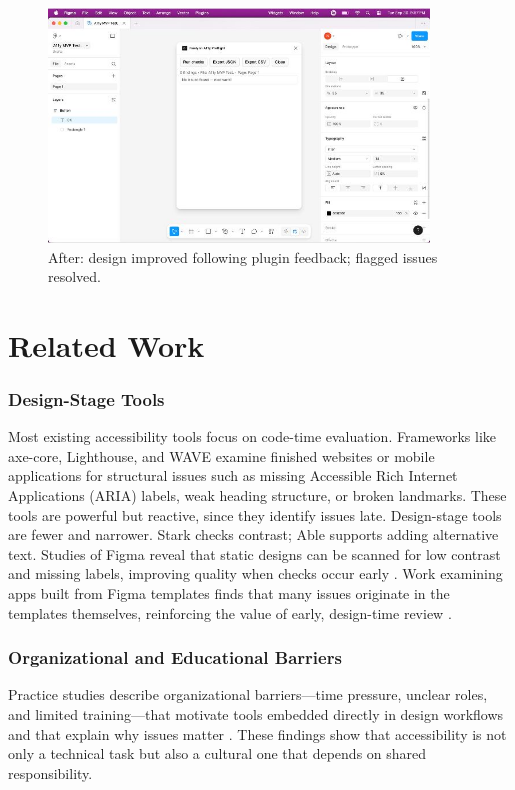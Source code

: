 \documentclass[12pt]{article}
\begin{document}
\begin{figure}[H]
  \centering
  \includegraphics[width=0.9\textwidth]{after.jpg}
  \caption{After: design improved following plugin feedback; flagged issues resolved.}
  \label{fig:after}
\end{figure}

\section{Related Work}

\subsubsection*{Design-Stage Tools}
Most existing accessibility tools focus on code-time evaluation. Frameworks like axe-core, Lighthouse, and WAVE examine finished websites or mobile applications for structural issues such as missing Accessible Rich Internet Applications (ARIA) labels, weak heading structure, or broken landmarks. These tools are powerful but reactive, since they identify issues late. Design-stage tools are fewer and narrower. Stark checks contrast; Able supports adding alternative text. Studies of Figma reveal that static designs can be scanned for low contrast and missing labels, improving quality when checks occur early \cite{huang2024a11yfigma, chen2024figmaapps}. Work examining apps built from Figma templates finds that many issues originate in the templates themselves, reinforcing the value of early, design-time review \cite{muniz2024figmatemplates}.

\subsubsection*{Organizational and Educational Barriers}
Practice studies describe organizational barriers—time pressure, unclear roles, and limited training—that motivate tools embedded directly in design workflows and that explain why issues matter \cite{shi2023uxaccesspractice}. These findings show that accessibility is not only a technical task but also a cultural one that depends on shared responsibility.
\end{document}
